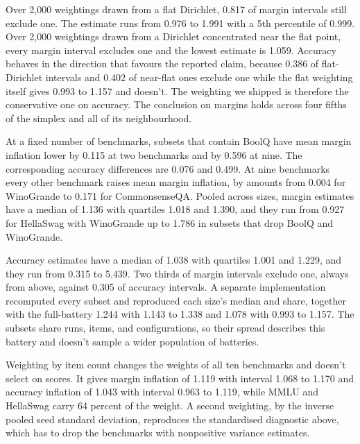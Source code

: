 Over 2,000 weightings drawn from a flat Dirichlet, 0.817 of margin intervals still exclude one. The estimate runs from 0.976 to 1.991 with a 5th percentile of 0.999. Over 2,000 weightings drawn from a Dirichlet concentrated near the flat point, every margin interval excludes one and the lowest estimate is 1.059. Accuracy behaves in the direction that favours the reported claim, because 0.386 of flat-Dirichlet intervals and 0.402 of near-flat ones exclude one while the flat weighting itself gives 0.993 to 1.157 and doesn't. The weighting we shipped is therefore the conservative one on accuracy. The conclusion on margins holds across four fifths of the simplex and all of its neighbourhood.

At a fixed number of benchmarks, subsets that contain BoolQ have mean margin inflation lower by 0.115 at two benchmarks and by 0.596 at nine. The corresponding accuracy differences are 0.076 and 0.499. At nine benchmarks every other benchmark raises mean margin inflation, by amounts from 0.004 for WinoGrande to 0.171 for CommonsenseQA. Pooled across sizes, margin estimates have a median of 1.136 with quartiles 1.018 and 1.390, and they run from 0.927 for HellaSwag with WinoGrande up to 1.786 in subsets that drop BoolQ and WinoGrande.

Accuracy estimates have a median of 1.038 with quartiles 1.001 and 1.229, and they run from 0.315 to 5.439. Two thirds of margin intervals exclude one, always from above, against 0.305 of accuracy intervals. A separate implementation recomputed every subset and reproduced each size's median and share, together with the full-battery 1.244 with 1.143 to 1.338 and 1.078 with 0.993 to 1.157. The subsets share runs, items, and configurations, so their spread describes this battery and doesn't sample a wider population of batteries.

Weighting by item count changes the weights of all ten benchmarks and doesn't select on scores. It gives margin inflation of 1.119 with interval 1.068 to 1.170 and accuracy inflation of 1.043 with interval 0.963 to 1.119, while MMLU and HellaSwag carry 64 percent of the weight. A second weighting, by the inverse pooled seed standard deviation, reproduces the standardised diagnostic above, which has to drop the benchmarks with nonpositive variance estimates.

